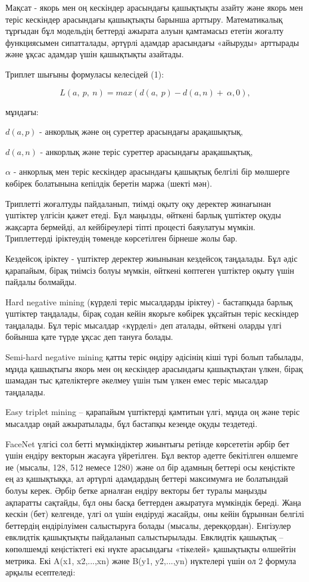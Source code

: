 \begin{multicols}{2}
Мақсат - якорь мен оң кескіндер арасындағы қашықтықты азайту және якорь
мен теріс кескіндер арасындағы қашықтықты барынша арттыру. Математикалық
тұрғыдан бұл модельдің беттерді ажырата алуын қамтамасыз ететін жоғалту
функциясымен сипатталады, әртүрлі адамдар арасындағы «айыруды» арттырады
және ұқсас адамдар үшін қашықтықты азайтады.

Триплет шығыны формуласы келесідей (1):

\begin{equation}
L(a,\ p,\ n) = max(d(a,\ p) - d(a,n) + \ \alpha,0),
\end{equation}

мұндағы:

$d(a,p)$ - анкорлық және оң суреттер арасындағы арақашықтық,

$d(a,n)$ - анкорлық және теріс суреттер арасындағы арақашықтық,

$\alpha$ - анкорлық мен теріс кескіндер арасындағы қашықтық белгілі бір
мөлшерге көбірек болатынына кепілдік беретін маржа (шекті мән).

Триплетті жоғалтуды пайдаланып, тиімді оқыту оқу деректер жинағынан
үштіктер үлгісін қажет етеді. Бұл маңызды, өйткені барлық үштіктер оқуды
жақсарта бермейді, ал кейбіреулері тіпті процесті баяулатуы мүмкін.
Триплеттерді іріктеудің төменде көрсетілген бірнеше жолы бар.

Кездейсоқ іріктеу - үштіктер деректер жиынынан кездейсоқ таңдалады. Бұл
әдіс қарапайым, бірақ тиімсіз болуы мүмкін, өйткені көптеген үштіктер
оқыту үшін пайдалы болмайды.

Hard negative mining (күрделі теріс мысалдарды іріктеу) - бастапқыда
барлық үштіктер таңдалады, бірақ содан кейін якорьге көбірек ұқсайтын
теріс кескіндер таңдалады. Бұл теріс мысалдар «күрделі» деп аталады,
өйткені оларды үлгі бойынша қате түрде ұқсас деп тануға болады.

Semi-hard negative mining қатты теріс өндіру әдісінің кіші түрі болып
табылады, мұнда қашықтығы якорь мен оң кескіндер арасындағы қашықтықтан
үлкен, бірақ шамадан тыс қателіктерге әкелмеу үшін тым үлкен емес теріс
мысалдар таңдалады.

Easy triplet mining -- қарапайым үштіктерді қамтитын үлгі, мұнда оң және
теріс мысалдар оңай ажыратылады, бұл бастапқы кезеңде оқуды тездетеді.

FaceNet үлгісі сол бетті мүмкіндіктер жиынтығы ретінде көрсететін әрбір
бет үшін ендіру векторын жасауға үйретілген. Бұл вектор әдетте
бекітілген өлшемге ие (мысалы, 128, 512 немесе 1280) және ол бір адамның
беттері осы кеңістікте ең аз қашықтыққа, ал әртүрлі адамдардың беттері
максимумға ие болатындай болуы керек. Әрбір бетке арналған ендіру
векторы бет туралы маңызды ақпаратты сақтайды, бұл оны басқа беттерден
ажыратуға мүмкіндік береді. Жаңа кескін (бет) келгенде, үлгі ол үшін
ендіруді жасайды, оны кейін бұрыннан белгілі беттердің ендірілуімен
салыстыруға болады (мысалы, дерекқордан). Енгізулер евклидтік қашықтықты
пайдаланып салыстырылады. Евклидтік қашықтық -- көпөлшемді кеңістіктегі
екі нүкте арасындағы «тікелей» қашықтықты өлшейтін метрика. Екі A(x1,
x2,...,xn) және B(y1, y2,...,yn) нүктелері үшін ол 2 формула арқылы
есептеледі:


\end{multicols}
